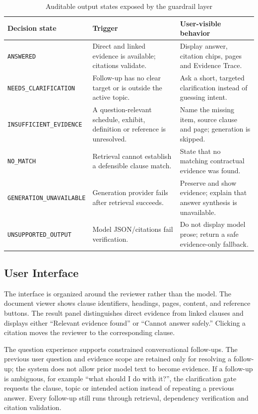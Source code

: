 \documentclass[12pt,a4paper,oneside]{report}
\begin{document}
\begin{table}[H]
\centering
\begin{tabularx}{\textwidth}{p{}p{}X}
\toprule
\textbf{Decision state} & \textbf{Trigger} & \textbf{User-visible behavior}\\
\midrule
\texttt{ANSWERED} & Direct and linked evidence is available; citations validate. & Display answer, citation chips, pages and Evidence Trace.\\
\texttt{NEEDS\_CLARIFICATION} & Follow-up has no clear target or is outside the active topic. & Ask a short, targeted clarification instead of guessing intent.\\
\texttt{INSUFFICIENT\_EVIDENCE} & A question-relevant schedule, exhibit, definition or reference is unresolved. & Name the missing item, source clause and page; generation is skipped.\\
\texttt{NO\_MATCH} & Retrieval cannot establish a defensible clause match. & State that no matching contractual evidence was found.\\
\texttt{GENERATION\_UNAVAILABLE} & Generation provider fails after retrieval succeeds. & Preserve and show evidence; explain that answer synthesis is unavailable.\\
\texttt{UNSUPPORTED\_OUTPUT} & Model JSON/citations fail verification. & Do not display model prose; return a safe evidence-only fallback.\\
\bottomrule
\end{tabularx}
\caption{Auditable output states exposed by the guardrail layer}
\end{table}

\subsection{User Interface}
The interface is organized around the reviewer rather than the model. The document viewer shows clause identifiers, headings, pages, content, and reference buttons. The result panel distinguishes direct evidence from linked clauses and displays either ``Relevant evidence found'' or ``Cannot answer safely.'' Clicking a citation moves the reviewer to the corresponding clause.

The question experience supports constrained conversational follow-ups. The previous user question and evidence scope are retained only for resolving a follow-up; the system does not allow prior model text to become evidence. If a follow-up is ambiguous, for example ``what should I do with it?'', the clarification gate requests the clause, topic or intended action instead of repeating a previous answer. Every follow-up still runs through retrieval, dependency verification and citation validation.
\end{document}
